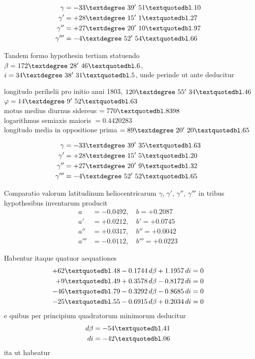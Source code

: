 \documentclass[12pt,a4paper]{article}
\begin{document}
\begin{align*}
\gamma &= -33\textdegree\ 39'\ 51\textquotedbl.10 \\
\gamma' &= +28\textdegree\ 15'\ 1\textquotedbl.27 \\
\gamma'' &= +27\textdegree\ 20'\ 10\textquotedbl.97 \\
\gamma''' &= -4\textdegree\ 52'\ 54\textquotedbl.66
\end{align*}

Tandem formo hypothesin tertiam statuendo $\beta = 172\textdegree\ 28'\ 46\textquotedbl.6$,
$i = 34\textdegree\ 38'\ 31\textquotedbl.5$, unde perinde ut ante deducitur

\begin{center}
longitudo perihelii pro initio anni 1803, $120\textdegree\ 55'\ 34\textquotedbl.46$ \\
$\varphi = 14\textdegree\ 9'\ 52\textquotedbl.63$ \\
motus medius diurnus sidereus $= 770\textquotedbl.8398$ \\
logarithmus semiaxis maioris $= 0.4420283$ \\
longitudo media in oppositione prima $= 89\textdegree\ 20'\ 20\textquotedbl.65$
\end{center}

\begin{align*}
\gamma &= -33\textdegree\ 39'\ 35\textquotedbl.63 \\
\gamma' &= +28\textdegree\ 15'\ 5\textquotedbl.20 \\
\gamma'' &= +27\textdegree\ 20'\ 9\textquotedbl.32 \\
\gamma''' &= -4\textdegree\ 52'\ 52\textquotedbl.65
\end{align*}

Comparatio valorum latitudinum heliocentricarum $\gamma$, $\gamma'$, $\gamma''$, $\gamma'''$ in tribus
hypothesibus inventarum producit
\begin{align*}
a &= -0.0492, \quad b = +0.2087 \\
a' &= +0.0212, \quad b' = +0.0745 \\
a'' &= +0.0317, \quad b'' = +0.0042 \\
a''' &= -0.0112, \quad b''' = +0.0223
\end{align*}

Habentur itaque quatuor aequationes
\begin{align*}
+62\textquotedbl.48 - 0.1744\,d\beta + 1.1957\,di &= 0 \\
+9\textquotedbl.49 + 0.3578\,d\beta - 0.8172\,di &= 0 \\
-46\textquotedbl.79 - 0.3292\,d\beta - 0.8685\,di &= 0 \\
-25\textquotedbl.55 - 0.6915\,d\beta + 0.2034\,di &= 0
\end{align*}
e quibus per principium quadratorum minimorum deducitur
\begin{align*}
d\beta &= -54\textquotedbl.41 \\
di &= -42\textquotedbl.06
\end{align*}
ita ut habeatur
\end{document}
